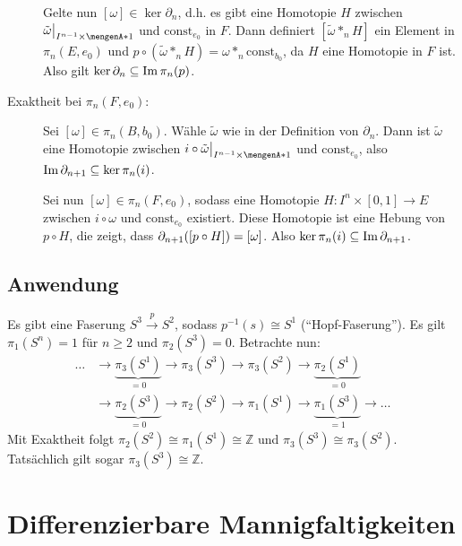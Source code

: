 \begin{description}
	Gelte nun $[\omega] \in \ker \partial_n$, d.h. es gibt eine Homotopie $H$ zwischen $\tilde{\omega}\big|_{I^{n-1} \times	\set{1}}$ und 
	 $\mathrm{const}_{e_0}$ in $F$.
	Dann definiert $[\tilde{\omega} *_n H]$ ein Element in $\pi_n(E,e_0)$ und $p \circ (\tilde{\omega} *_n H) = \omega *_n \mathrm{const}_{b_0}$, da $H$ eine Homotopie in
	$F$ ist. Also gilt $\ker \partial_n \subseteq \operatorname{Im} \pi_n(p)$.
	\item[Exaktheit bei $\pi_n(F, e_0)$:] Sei $[\omega] \in \pi_n(B,b_0)$. Wähle $\tilde{\omega}$ wie in der Definition von $\partial_n$. Dann ist $\tilde{\omega}$ eine 
	Homotopie zwischen $i \circ \tilde{\omega} \big|_{I^{n-1} \times \set{1}}$ und $\mathrm{const}_{e_0}$, also $\operatorname{Im} \partial_{n+1} \subseteq \ker \pi_n(i)$.
	
	Sei nun $[\omega] \in \pi_n(F,e_0)$, sodass eine Homotopie $H : I^n \times [0,1] \to E$ zwischen $i	 \circ \omega$ und $\mathrm{const}_{e_0}$ existiert. Diese Homotopie
	ist eine Hebung von $p \circ H$, die zeigt, dass $\partial_{n+1} \enbrace*{ [p \circ H]} = [\omega]$. Also $\ker \pi_n(i) \subseteq \operatorname{Im} \partial_{n+1}$. \bewende
\end{description}

\subsection[Anwendung des Satzes über Faserungen]{Anwendung} %
\label{sub:1412}
Es gibt eine Faserung $S^3 \xrightarrow{p} S^2 $, sodass $p ^{-1}(s) \cong S^1$ (\enquote{Hopf-Faserung}). Es gilt $\pi_1(S^n)= 1$ für $n \ge 2$ und $\pi_2(S^3)= 0$.
Betrachte nun:
\begin{align*}
	\ldots  &\longrightarrow \underbrace{\pi_3(S^1)}_{=0} \longrightarrow \pi_3(S^3) \longrightarrow \pi_3(S^2) \longrightarrow \underbrace{\pi_2(S^1)}_{=0} \\
	&\longrightarrow \underbrace{\pi_2(S^3)}_{=0} \longrightarrow \pi_2(S^2) \longrightarrow \pi_1(S^1) \longrightarrow \underbrace{\pi_1(S^3)}_{=1} \longrightarrow \ldots 
\end{align*}
Mit Exaktheit folgt $\pi_2(S^2) \cong \pi_1(S^1) \cong \mathds{Z}$ und $\pi_3(S^3) \cong \pi_3(S^2)$. Tatsächlich gilt sogar $\pi_3(S^3) \cong \mathds{Z}$.
\newpage

\section{Differenzierbare Mannigfaltigkeiten} %
\label{sec:15}


